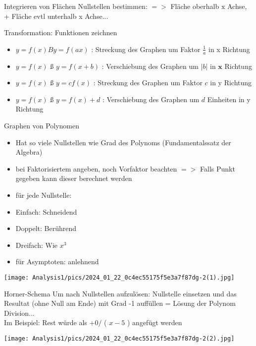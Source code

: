 \begin{KR}{Integrieren von Flächen}
Nullstellen bestimmen: $=>$ Fläche oberhalb $\mathrm{x}$ Achse, + Fläche evtl unterhalb x Achse...
\end{KR}

\begin{KR}{Transformation: Funktionen zeichnen}
    \begin{itemize}
    \item $y=f(x) B y=f(a x)$ : Streckung des Graphen um Faktor $\frac{1}{a}$ in x Richtung
  \item $y=f(x)$ ß $y=f(x+b)$ : Verschiebung des Graphen um $|b|$ in $\mathbf{x}$ Richtung
  \item $y=f(x)$ ß $y=c f(x)$ : Streckung des Graphen um Faktor $c$ in y Richtung
  \item $y=f(x)$ ß $y=f(x)+d$ : Verschiebung des Graphen um $d$ Einheiten in y Richtung
\end{itemize}
\end{KR}

\begin{concept}{Graphen von Polynomen}
    \begin{itemize}
  \item Hat so viele Nullstellen wie Grad des Polynoms (Fundamentalssatz der Algebra)
  \item bei Faktorisiertem angeben, noch Vorfaktor beachten $=>$ Falls Punkt gegeben kann dieser berechnet werden
  \item für jede Nullstelle:
  \item Einfach: Schneidend
  \item Doppelt: Berührend
  \item Dreifach: Wie $x^{3}$
  \item für Asymptoten: anlehnend
\end{itemize}
\end{concept}

\texttt{[image: Analysis1/pics/2024\_01\_22\_0c4ec55175f5e3a7f87dg-2(1).jpg]}

\begin{concept}{Horner-Schema}
    Um nach Nullstellen aufzulösen: Nullstelle einsetzen und das Resultat (ohne Null am Ende) mit Grad -1 auffüllen = Lösung der Polynom Division...\\
    Im Beispiel: Rest würde als $+0 /$ ( $x-5$ ) angefügt werden
\end{concept}

\texttt{[image: Analysis1/pics/2024\_01\_22\_0c4ec55175f5e3a7f87dg-2(2).jpg]}

